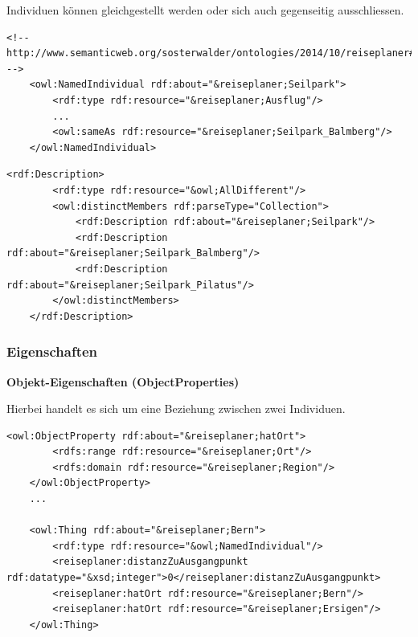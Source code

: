 \newpage

Individuen können gleichgestellt werden oder sich auch gegenseitig ausschliessen.

\begin{lstlisting}[caption={Beispiel einer Gleichstellung von Individuen}]
    <!-- http://www.semanticweb.org/sosterwalder/ontologies/2014/10/reiseplaner#Seilpark -->
    <owl:NamedIndividual rdf:about="&reiseplaner;Seilpark">
        <rdf:type rdf:resource="&reiseplaner;Ausflug"/>
        ...
        <owl:sameAs rdf:resource="&reiseplaner;Seilpark_Balmberg"/>
    </owl:NamedIndividual>
\end{lstlisting}

\begin{lstlisting}[caption={Beispiel einer Differenzierung von Individuen}]
    <rdf:Description>
        <rdf:type rdf:resource="&owl;AllDifferent"/>
        <owl:distinctMembers rdf:parseType="Collection">
            <rdf:Description rdf:about="&reiseplaner;Seilpark"/>
            <rdf:Description rdf:about="&reiseplaner;Seilpark_Balmberg"/>
            <rdf:Description rdf:about="&reiseplaner;Seilpark_Pilatus"/>
        </owl:distinctMembers>
    </rdf:Description>

\end{lstlisting}



\subsubsection{Eigenschaften}
\label{subsubsec:owlRdf_owl_wissenModellieren_wichtigsteElemente_Propertys}

\textbf{Objekt-Eigenschaften (ObjectProperties)}

Hierbei handelt es sich um eine Beziehung zwischen zwei Individuen.

\begin{lstlisting}[caption={Beispiel einer Objekteigenschaft \textit{hatOrt} und deren Anwendung}]
    <owl:ObjectProperty rdf:about="&reiseplaner;hatOrt">
        <rdfs:range rdf:resource="&reiseplaner;Ort"/>
        <rdfs:domain rdf:resource="&reiseplaner;Region"/>
    </owl:ObjectProperty>
    ...
    
    <owl:Thing rdf:about="&reiseplaner;Bern">
        <rdf:type rdf:resource="&owl;NamedIndividual"/>
        <reiseplaner:distanzZuAusgangpunkt rdf:datatype="&xsd;integer">0</reiseplaner:distanzZuAusgangpunkt>
        <reiseplaner:hatOrt rdf:resource="&reiseplaner;Bern"/>
        <reiseplaner:hatOrt rdf:resource="&reiseplaner;Ersigen"/>
    </owl:Thing>
\end{lstlisting}

